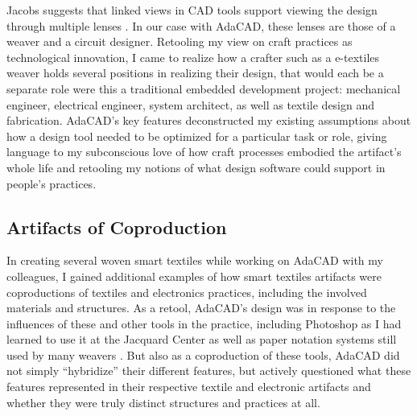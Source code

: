 Jacobs suggests that linked views in CAD tools support viewing the design through multiple lenses \cite{jacobs_codeable_2013}. In our case with AdaCAD, these lenses are those of a weaver and a circuit designer. Retooling my view on craft practices as technological innovation, I came to realize how a crafter such as a e-textiles weaver holds several positions in realizing their design, that would each be a separate role were this a traditional embedded development project: mechanical engineer, electrical engineer, system architect, as well as textile design and fabrication. AdaCAD's key features deconstructed my existing assumptions about how a design tool needed to be optimized for a particular task or role, giving language to my subconscious love of how craft processes embodied the artifact's whole life and retooling my notions of what design software could support in people's practices.

\subsection{Artifacts of Coproduction}

In creating several woven smart textiles while working on AdaCAD with my colleagues, I gained additional examples of how smart textiles artifacts were coproductions of textiles and electronics practices, including the involved materials and structures. As a retool, AdaCAD's design was in response to the influences of these and other tools in the practice, including Photoshop as I had learned to use it at the Jacquard Center as well as paper notation systems still used by many weavers \cite{chandler_learning_2009}. But also as a coproduction of these tools, AdaCAD did not simply ``hybridize'' their different features, but actively questioned what these features represented in their respective textile and electronic artifacts and whether they were truly distinct structures and practices at all. 


